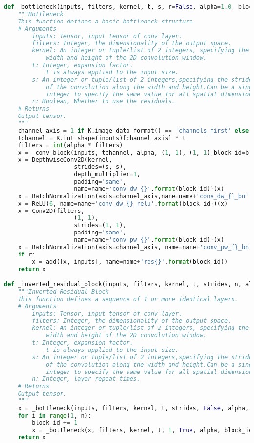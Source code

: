 \begin{lstlisting}[language=Python]
def _bottleneck(inputs, filters, kernel, t, s, r=False, alpha=1.0, block_id=1, train_bn = False, name=''):
    """Bottleneck
    This function defines a basic bottleneck structure.
    # Arguments
        inputs: Tensor, input tensor of conv layer.
        filters: Integer, the dimensionality of the output space.
        kernel: An integer or tuple/list of 2 integers, specifying the
            width and height of the 2D convolution window.
        t: Integer, expansion factor.
            t is always applied to the input size.
        s: An integer or tuple/list of 2 integers,specifying the strides
            of the convolution along the width and height.Can be a single
            integer to specify the same value for all spatial dimensions.
        r: Boolean, Whether to use the residuals.
    # Returns
	Output tensor.
    """
    channel_axis = 1 if K.image_data_format() == 'channels_first' else -1
    tchannel = K.int_shape(inputs)[channel_axis] * t
    filters = int(alpha * filters)
    x = _conv_block(inputs, tchannel, alpha, (1, 1), (1, 1),block_id=block_id, name=name)
    x = DepthwiseConv2D(kernel,
                    strides=(s, s),
                    depth_multiplier=1,
                    padding='same',
                    name=name+'conv_dw_{}'.format(block_id))(x)
    x = BatchNormalization(axis=channel_axis,name=name+'conv_dw_{}_bn'.format(block_id))(x)
    x = ReLU(6, name=name+'conv_dw_{}_relu'.format(block_id))(x)
    x = Conv2D(filters,
                    (1, 1),
                    strides=(1, 1),
                    padding='same',
                    name=name+'conv_pw_{}'.format(block_id))(x)
    x = BatchNormalization(axis=channel_axis, name=name+'conv_pw_{}_bn'.format(block_id))(x, training=train_bn)
    if r:
        x = add([x, inputs], name=name+'res{}'.format(block_id))
    return x

def _inverted_residual_block(inputs, filters, kernel, t, strides, n, alpha, block_id, name=''):
    """Inverted Residual Block
    This function defines a sequence of 1 or more identical layers.
    # Arguments
        inputs: Tensor, input tensor of conv layer.
        filters: Integer, the dimensionality of the output space.
        kernel: An integer or tuple/list of 2 integers, specifying the
            width and height of the 2D convolution window.
        t: Integer, expansion factor.
            t is always applied to the input size.
        s: An integer or tuple/list of 2 integers,specifying the strides
            of the convolution along the width and height.Can be a single
            integer to specify the same value for all spatial dimensions.
        n: Integer, layer repeat times.
    # Returns
	Output tensor.
    """
    x = _bottleneck(inputs, filters, kernel, t, strides, False, alpha, block_id, name=name)
    for i in range(1, n):
        block_id += 1
        x = _bottleneck(x, filters, kernel, t, 1, True, alpha, block_id, name=name)
    return x


\end{lstlisting}
